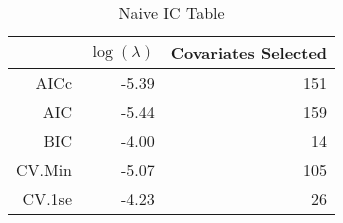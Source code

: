 \begin{table}[ht]
\centering
\begin{tabular}{rrr}
  \hline
 & $\log(\lambda)$ & Covariates Selected \\ 
  \hline
AICc & -5.39 & 151 \\ 
  AIC & -5.44 & 159 \\ 
  BIC & -4.00 &  14 \\ 
  CV.Min & -5.07 & 105 \\ 
  CV.1se & -4.23 &  26 \\ 
   \hline
\end{tabular}
\caption{Naive IC Table} 
\label{tab:naive_ic}
\end{table}
